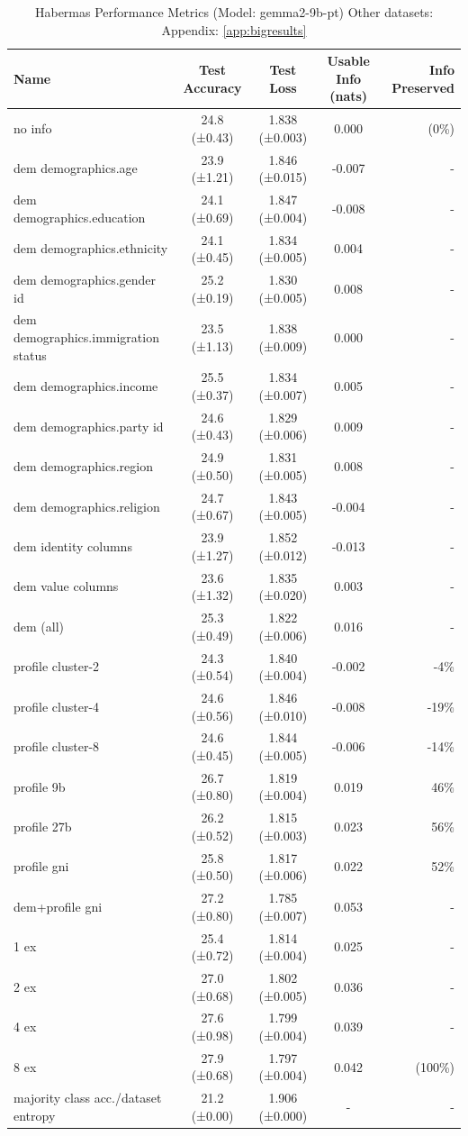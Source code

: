 \documentclass[11pt]{article}
\begin{document}
\begin{table}[h]
\centering
\small
\begin{tabular}{|l|c|c|c|r|}
\hline
Name & Test Accuracy & Test Loss & Usable Info (nats) & Info Preserved \\
\hline
no info & 24.8 (±0.43) & 1.838 (±0.003) & 0.000 & (0\%) \\
dem demographics.age & 23.9 (±1.21) & 1.846 (±0.015) & -0.007 & - \\
dem demographics.education & 24.1 (±0.69) & 1.847 (±0.004) & -0.008 & - \\
dem demographics.ethnicity & 24.1 (±0.45) & 1.834 (±0.005) & 0.004 & - \\
dem demographics.gender id & 25.2 (±0.19) & 1.830 (±0.005) & 0.008 & - \\
dem demographics.immigration status & 23.5 (±1.13) & 1.838 (±0.009) & 0.000 & - \\
dem demographics.income & 25.5 (±0.37) & 1.834 (±0.007) & 0.005 & - \\
dem demographics.party id & 24.6 (±0.43) & 1.829 (±0.006) & 0.009 & - \\
dem demographics.region & 24.9 (±0.50) & 1.831 (±0.005) & 0.008 & - \\
dem demographics.religion & 24.7 (±0.67) & 1.843 (±0.005) & -0.004 & - \\
dem identity columns & 23.9 (±1.27) & 1.852 (±0.012) & -0.013 & - \\
dem value columns & 23.6 (±1.32) & 1.835 (±0.020) & 0.003 & - \\
dem (all) & 25.3 (±0.49) & 1.822 (±0.006) & 0.016 & - \\
profile cluster-2 & 24.3 (±0.54) & 1.840 (±0.004) & -0.002 & -4\% \\
profile cluster-4 & 24.6 (±0.56) & 1.846 (±0.010) & -0.008 & -19\% \\
profile cluster-8 & 24.6 (±0.45) & 1.844 (±0.005) & -0.006 & -14\% \\
profile 9b & 26.7 (±0.80) & 1.819 (±0.004) & 0.019 & 46\% \\
profile 27b & 26.2 (±0.52) & 1.815 (±0.003) & 0.023 & 56\% \\
profile gni & 25.8 (±0.50) & 1.817 (±0.006) & 0.022 & 52\% \\
dem+profile gni & 27.2 (±0.80) & 1.785 (±0.007) & 0.053 & - \\
1 ex & 25.4 (±0.72) & 1.814 (±0.004) & 0.025 & - \\
2 ex & 27.0 (±0.68) & 1.802 (±0.005) & 0.036 & - \\
4 ex & 27.6 (±0.98) & 1.799 (±0.004) & 0.039 & - \\
8 ex & 27.9 (±0.68) & 1.797 (±0.004) & 0.042 & (100\%) \\
majority class acc./dataset entropy & 21.2 (±0.00) & 1.906 (±0.000) & - & - \\
\hline
\end{tabular}
\caption{Habermas Performance Metrics (Model: gemma2-9b-pt) Other datasets: Appendix: \ref{app:bigresults}}
\label{tab:performance_habermas}
\end{table}
\end{document}
